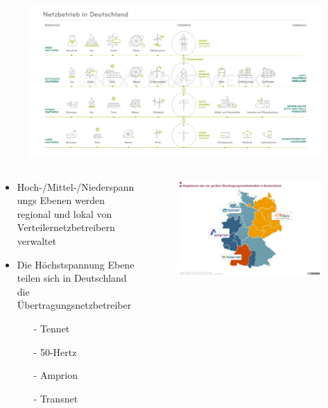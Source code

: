 \documentclass[aspectratio=1610, professionalfonts, 9pt]{beamer}
\begin{document}
{\begin{frame}
\begin{figure}
  \includegraphics[width=1\textwidth]{images/netzbetrieb-deutsches-stromnetz.jpg}
\end{figure}
\end{frame}
}

\begin{frame}
  \begin{columns}
    \begin{column}{0.5\textwidth}
  \begin{itemize}
    \item Hoch-/Mittel-/Niederspannungs Ebenen
     werden regional und lokal von Verteilernetzbetreibern verwaltet
    \item Die Höchstspannung Ebene teilen sich in
    Deutschland die Übertragungsnetzbetreiber
    \begin{itemize}
      \item[-] Tennet
      \item[-] 50-Hertz
      \item[-] Amprion
      \item[-] Transnet
  \end{itemize}
\end{itemize}
\end{column}
\begin{column}{0.5\textwidth}
\begin{figure}
    \includegraphics[width=1\textwidth]{images/UNB.jpg}
\end{figure}
\end{column}
\end{columns}
\end{frame}
\end{document}
